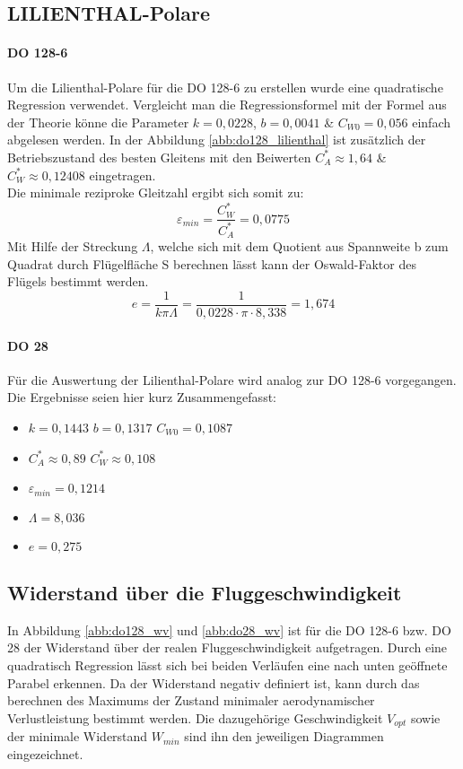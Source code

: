 \subsection{LILIENTHAL-Polare}
\paragraph{DO 128-6} Um die Lilienthal-Polare für die DO 128-6 zu erstellen wurde eine quadratische Regression verwendet. Vergleicht man die Regressionsformel mit der Formel aus der Theorie könne die Parameter $k=0,0228$, $b=0,0041$ \& $C_{W0}=0,056$ einfach abgelesen werden. In der Abbildung \ref{abb:do128_lilienthal} ist zusätzlich der Betriebszustand des besten Gleitens mit den Beiwerten $C_{A}^* \approx 1,64$ \& $C_{W}^*\approx 0,12408$ eingetragen.\\
Die minimale reziproke Gleitzahl ergibt sich somit zu:
\begin{equation*}
\varepsilon_{min}=\frac{C_W^*}{C_A^*}=0,0775
\end{equation*}
Mit Hilfe der Streckung $\Lambda$, welche sich mit dem Quotient aus Spannweite b zum Quadrat durch Flügelfläche S berechnen lässt kann der Oswald-Faktor des Flügels bestimmt werden. 
\begin{equation*}
e=\frac{1}{k\pi \Lambda}=\frac{1}{0,0228 \cdot \pi \cdot 8,338} = 1,674
\end{equation*}
\paragraph{DO 28} Für die Auswertung der Lilienthal-Polare wird analog zur DO 128-6 vorgegangen. Die Ergebnisse seien hier kurz Zusammengefasst:
\begin{itemize}
	\item $k=0,1443$ \hspace{5mm}  $b=0,1317$ \hspace{5mm}   $C_{W0}=0,1087$
	\item $C_{A}^* \approx 0,89$ \hspace{5mm}   $C_{W}^* \approx 0,108$
	\item $\varepsilon_{min}=0,1214$
	\item $\Lambda=8,036$ 
	\item $e=0,275$
\end{itemize}
\vspace{3mm}
\subsection{Widerstand über die Fluggeschwindigkeit}
In Abbildung \ref{abb:do128_wv} und \ref{abb:do28_wv} ist für die DO 128-6 bzw. DO 28 der Widerstand über der realen Fluggeschwindigkeit aufgetragen. Durch eine quadratisch Regression lässt sich bei beiden Verläufen eine nach unten geöffnete Parabel erkennen. Da der Widerstand negativ definiert ist, kann durch das berechnen des Maximums der Zustand minimaler aerodynamischer Verlustleistung bestimmt werden. Die dazugehörige Geschwindigkeit $V_{opt}$ sowie der minimale Widerstand $W_{min}$ sind ihn den jeweiligen Diagrammen eingezeichnet.\\
